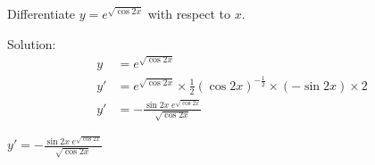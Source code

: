 \begin{mtask}
   \task \begin{exercise} Differentiate $y=e^{\sqrt{\cos 2x}}$ with respect to $x$.
             \begin{envSolution}
			      Solution:\\
			      \begin{align*}
			           y  & =e^{\sqrt{\cos 2x}}                                                      \\[15pt]
                       y' & =e^{\sqrt{\cos 2x}} \times \frac{1}{2} (\cos 2x)^{-\frac{1}{2}} \times (-\sin 2x) \times 2 \\[10pt]
   					   y' & =-\frac{\sin 2x \; e^{\sqrt{\cos 2x}} } {\sqrt{\cos 2x}}
				 \end{align*}
                 \begin{shortsolution}  
				       $y'  =-\frac{\sin 2x \; e^{\sqrt{\cos 2x}} } {\sqrt{\cos 2x}}$
			     \end{shortsolution}				 
               \end{envSolution}
         \end{exercise}
\end{mtask}



